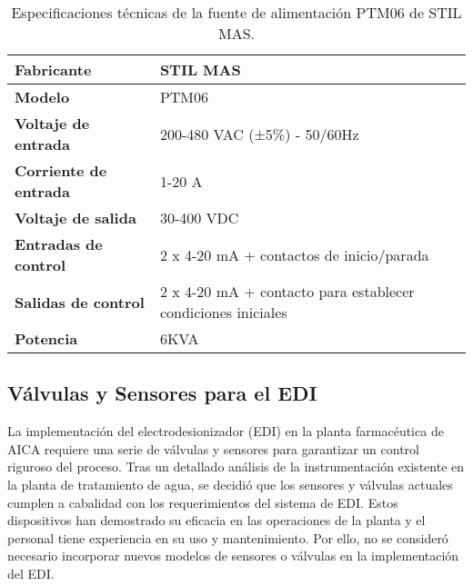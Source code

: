 \begin{table}[H]
    \centering
    \caption{Especificaciones técnicas de la fuente de alimentación PTM06 de STIL MAS.}
    \label{table:power_supply_specs}
    \begin{tabular}{| L{6cm} | L{6cm} |}
        \hline
        \textbf{Fabricante}           & STIL MAS                                                     \\
        \hline
        \textbf{Modelo}               & PTM06                                                        \\
        \hline
        \textbf{Voltaje de entrada}   & 200-480 VAC (±5\%) - 50/60Hz                                 \\
        \hline
        \textbf{Corriente de entrada} & 1-20 A                                                       \\
        \hline
        \textbf{Voltaje de salida}    & 30-400 VDC                                                   \\
        \hline
        \textbf{Entradas de control}  & 2 x 4-20 mA + contactos de inicio/parada                     \\
        \hline
        \textbf{Salidas de control}   & 2 x 4-20 mA + contacto para establecer condiciones iniciales \\
        \hline
        \textbf{Potencia}             & 6KVA                                                         \\
        \hline
    \end{tabular}
\end{table}


\subsection{Válvulas y Sensores para el EDI}
La implementación del electrodesionizador (EDI) en la planta farmacéutica de AICA requiere una serie de válvulas y sensores para garantizar un control riguroso del proceso. Tras un detallado análisis de la instrumentación existente en la planta de tratamiento de agua, se decidió que los sensores y válvulas actuales cumplen a cabalidad con los requerimientos del sistema de EDI. Estos dispositivos han demostrado su eficacia en las operaciones de la planta y el personal tiene experiencia en su uso y mantenimiento. Por ello, no se consideró necesario incorporar nuevos modelos de sensores o válvulas en la implementación del EDI.

